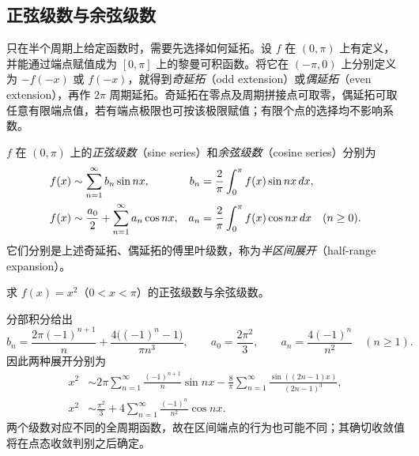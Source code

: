 \subsection{正弦级数与余弦级数}
\label{subsec:sine-and-cosine-series}

只在半个周期上给定函数时，需要先选择如何延拓。设 $f$ 在 $(0,\pi)$ 上有定义，并能通过端点赋值成为 $[0,\pi]$ 上的黎曼可积函数。将它在 $(-\pi,0)$ 上分别定义为 $-f(-x)$ 或 $f(-x)$，就得到\emph{奇延拓}（odd extension）或\emph{偶延拓}（even extension），再作 $2\pi$ 周期延拓。奇延拓在零点及周期拼接点可取零，偶延拓可取任意有限端点值，若有端点极限也可按该极限赋值；有限个点的选择均不影响系数。

\begin{definition}
\label{def:half-range-fourier-expansions}
$f$ 在 $(0,\pi)$ 上的\emph{正弦级数}（sine series）和\emph{余弦级数}（cosine series）分别为
\begin{align}
    f(x)&\sim\sum_{n=1}^\infty b_n\sin nx,
       & b_n&=\frac2\pi\int_0^\pi f(x)\sin nx\,dx,\notag\\
    f(x)&\sim\frac{a_0}{2}+\sum_{n=1}^\infty a_n\cos nx,
       & a_n&=\frac2\pi\int_0^\pi f(x)\cos nx\,dx\quad(n\geq0).
    \label{eq:half-range-fourier-coefficients}
\end{align}
它们分别是上述奇延拓、偶延拓的傅里叶级数，称为\emph{半区间展开}（half-range expansion）。
\end{definition}

\begin{example}
\label{ex:half-range-fourier-square}
求 $f(x)=x^2$（$0<x<\pi$）的正弦级数与余弦级数。
\end{example}

\begin{solve}
分部积分给出
\[
    b_n=\frac{2\pi(-1)^{n+1}}n
           +\frac{4\bigl((-1)^n-1\bigr)}{\pi n^3},
    \qquad a_0=\frac{2\pi^2}{3},\qquad
    a_n=\frac{4(-1)^n}{n^2}\quad(n\geq1).
\]
因此两种展开分别为
\begin{align}
    x^2&\sim2\pi\sum_{n=1}^\infty\frac{(-1)^{n+1}}n\sin nx
       -\frac8\pi\sum_{n=1}^\infty
                    \frac{\sin((2n-1)x)}{(2n-1)^3},
       \label{eq:half-range-square-sine}\\
    x^2&\sim\frac{\pi^2}{3}
          +4\sum_{n=1}^\infty\frac{(-1)^n}{n^2}\cos nx.
       \label{eq:half-range-square-cosine}
\end{align}
两个级数对应不同的全周期函数，故在区间端点的行为也可能不同；其确切收敛值将在点态收敛判别之后确定。
\end{solve}

